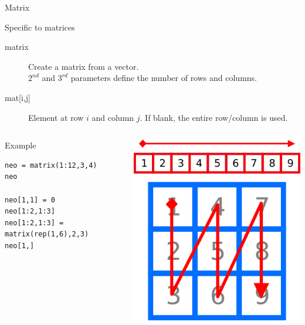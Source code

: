 \documentclass[10pt]{beamer}
\begin{document}
\begin{frame}[fragile]{Matrix}
  \begin{block}{Specific to matrices}
    \begin{description}
    \item[matrix] Create a {\sf matrix} from a {\sf vector}. \\$2^{nd}$ and $3^{rd}$ parameters define the number of rows and columns.
    \item[{mat[i,j]} ] Element at row $i$ and column $j$. If blank, the entire row/column is used.
    \end{description}    
  \end{block}
  \begin{columns}
    \begin{column}{.7\textwidth}
  \begin{exampleblock}{Example}
\begin{verbatim}
neo = matrix(1:12,3,4)
neo

neo[1,1] = 0
neo[1:2,1:3]
neo[1:2,1:3] = matrix(rep(1,6),2,3)
neo[1,]
\end{verbatim}
  \end{exampleblock}
    \end{column}
    \begin{column}{.3\textwidth}
      \includegraphics[width=\linewidth]{../imgs/matrixFillUpScheme.png}
    \end{column}
  \end{columns}
\end{frame}
\end{document}
